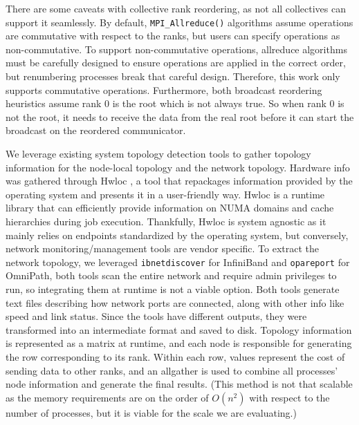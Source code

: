 There are some caveats with collective rank reordering, as not all collectives can support it seamlessly.
By default, \texttt{MPI\_Allreduce()} algorithms assume operations are commutative with respect to the ranks, but users can specify operations as non-commutative.
To support non-commutative operations, allreduce algorithms must be carefully designed to ensure operations are applied in the correct order, but renumbering processes break that careful design.
Therefore, this work only supports commutative operations.
Furthermore, both broadcast reordering heuristics assume rank 0 is the root which is not always true. 
So when rank 0 is not the root, it needs to receive the data from the real root before it can start the broadcast on the reordered communicator.

We leverage existing system topology detection tools to gather topology information for the node-local topology and the network topology.
Hardware info was gathered through Hwloc \cite{Broquedis2010hwloc}, a tool that repackages information provided by the operating system and presents it in a user-friendly way.
Hwloc is a runtime library that can efficiently provide information on \gls{NUMA} domains and cache hierarchies during job execution.
Thankfully, Hwloc is system agnostic as it mainly relies on endpoints standardized by the operating system, but conversely, network monitoring/management tools are vendor specific.
To extract the network topology, we leveraged \texttt{ibnetdiscover} for InfiniBand and \texttt{opareport} for OmniPath, both tools scan the entire network and require admin privileges to run, so integrating them at runtime is not a viable option.
Both tools generate text files describing how network ports are connected, along with other info like speed and link status.
Since the tools have different outputs, they were transformed into an intermediate format and saved to disk.
Topology information is represented as a matrix at runtime, and each node is responsible for generating the row corresponding to its rank.
Within each row, values represent the cost of sending data to other ranks, and an allgather is used to combine all processes' node information and generate the final results.
(This method is not that scalable as the memory requirements are on the order of $O(n^2)$ with respect to the number of processes, but it is viable for the scale we are evaluating.)

